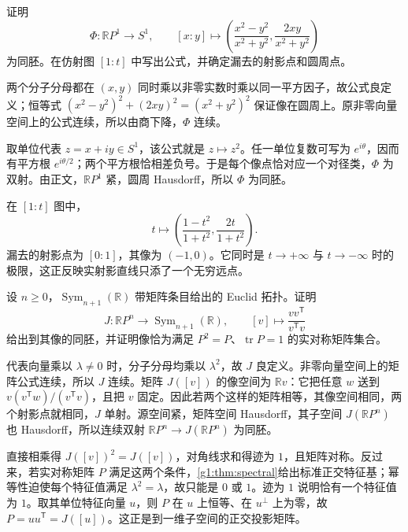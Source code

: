 \begin{exercise}\label{g1:ex:real-projective-circle}
	证明
	\[
		\Phi:\mathbb RP^1\longrightarrow S^1,\qquad
		[x:y]\longmapsto
		\left(\frac{x^2-y^2}{x^2+y^2},\frac{2xy}{x^2+y^2}\right)
	\]
	为同胚。在仿射图 \([1:t]\) 中写出公式，并确定漏去的射影点和圆周点。
\end{exercise}
\begin{solution}
	两个分子分母都在 \((x,y)\) 同时乘以非零实数时乘以同一平方因子，故公式良定义；恒等式 \((x^2-y^2)^2+(2xy)^2=(x^2+y^2)^2\) 保证像在圆周上。原非零向量空间上的公式连续，所以由商下降，\(\Phi\) 连续。

	取单位代表 \(z=x+iy\in S^1\)，该公式就是 \(z\mapsto z^2\)。任一单位复数可写为 \(e^{i\theta}\)，因而有平方根 \(e^{i\theta/2}\)；两个平方根恰相差负号。于是每个像点恰对应一个对径类，\(\Phi\) 为双射。由正文，\(\mathbb RP^1\) 紧，圆周 Hausdorff，所以 \(\Phi\) 为同胚。

	在 \([1:t]\) 图中，
	\[
		t\longmapsto\left(\frac{1-t^2}{1+t^2},\frac{2t}{1+t^2}\right).
	\]
	漏去的射影点为 \([0:1]\)，其像为 \((-1,0)\)。它同时是 \(t\to+\infty\) 与 \(t\to-\infty\) 时的极限，这正反映实射影直线只添了一个无穷远点。
\end{solution}

\begin{exercise}\label{g1:ex:projective-projection-matrix}
	设 \(n\ge0\)，\(\operatorname{Sym}_{n+1}(\mathbb R)\) 带矩阵条目给出的 Euclid 拓扑。证明
	\[
		J:\mathbb RP^n\longrightarrow\operatorname{Sym}_{n+1}(\mathbb R),\qquad
		[v]\longmapsto\frac{vv^{\mathsf T}}{v^{\mathsf T}v}
	\]
	给出到其像的同胚，并证明像恰为满足 \(P^2=P\)、\(\operatorname{tr}P=1\) 的实对称矩阵集合。
\end{exercise}
\begin{solution}
	代表向量乘以 \(\lambda\ne0\) 时，分子分母均乘以 \(\lambda^2\)，故 \(J\) 良定义。非零向量空间上的矩阵公式连续，所以 \(J\) 连续。矩阵 \(J([v])\) 的像空间为 \(\mathbb Rv\)：它把任意 \(w\) 送到 \(v(v^{\mathsf T}w)/(v^{\mathsf T}v)\)，且把 \(v\) 固定。因此若两个这样的矩阵相等，其像空间相同，两个射影点就相同，\(J\) 单射。源空间紧，矩阵空间 Hausdorff，其子空间 \(J(\mathbb RP^n)\) 也 Hausdorff，所以连续双射 \(\mathbb RP^n\to J(\mathbb RP^n)\) 为同胚。

	直接相乘得 \(J([v])^2=J([v])\)，对角线求和得迹为 \(1\)，且矩阵对称。反过来，若实对称矩阵 \(P\) 满足这两个条件，\cref{g1:thm:spectral}给出标准正交特征基；幂等性迫使每个特征值满足 \(\lambda^2=\lambda\)，故只能是 \(0\) 或 \(1\)。迹为 \(1\) 说明恰有一个特征值为 \(1\)。取其单位特征向量 \(u\)，则 \(P\) 在 \(u\) 上恒等、在 \(u^\perp\) 上为零，故 \(P=uu^{\mathsf T}=J([u])\)。这正是到一维子空间的正交投影矩阵。
\end{solution}

